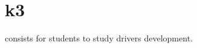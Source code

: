 %
%
%
%
%
%

%
%

\chapter{k3}
\label{chapter:k3}

 consists for students to study drivers development.

\newpage

%
%

